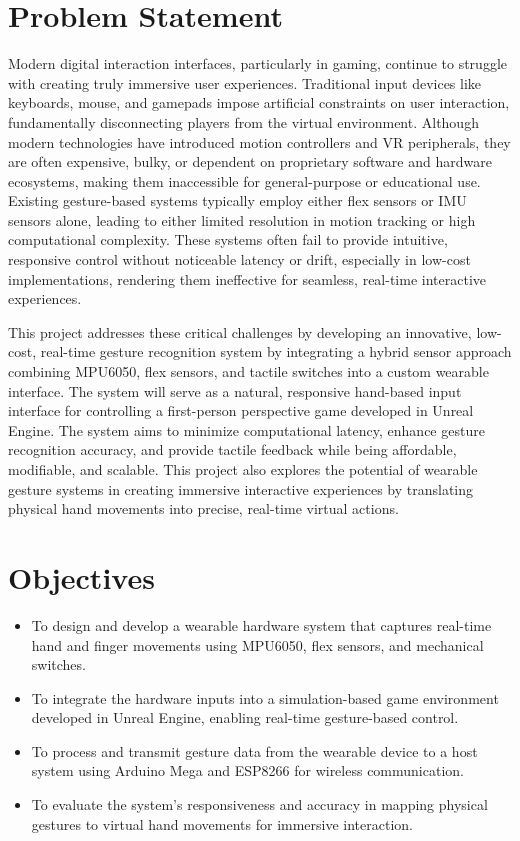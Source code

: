 \vspace{1.5\baselineskip} 

\section{Problem Statement}
Modern digital interaction interfaces, particularly in gaming, continue to struggle with creating truly immersive user experiences. Traditional input devices like keyboards, mouse, and gamepads impose artificial constraints on user interaction, fundamentally disconnecting players from the virtual environment. Although modern technologies have introduced motion controllers and VR peripherals, they are often expensive, bulky, or dependent on proprietary software and hardware ecosystems, making them inaccessible for general-purpose or educational use. Existing gesture-based systems typically employ either flex sensors or IMU sensors alone, leading to either limited resolution in motion tracking or high computational complexity. These systems often fail to provide intuitive, responsive control without noticeable latency or drift, especially in low-cost implementations, rendering them ineffective for seamless, real-time interactive experiences.  

This project addresses these critical challenges by developing an innovative, low-cost, real-time gesture recognition system by integrating a hybrid sensor approach combining MPU6050, flex sensors, and tactile switches into a custom wearable interface. The system will serve as a natural, responsive hand-based input interface for controlling a first-person perspective game developed in Unreal Engine. The system aims to minimize computational latency, enhance gesture recognition accuracy, and provide tactile feedback while being affordable, modifiable, and scalable. This project also explores the potential of wearable gesture systems in creating immersive interactive experiences by translating physical hand movements into precise, real-time virtual actions. 

\vspace{1.5\baselineskip} 

\section{Objectives}
\begin{itemize}
    \item To design and develop a wearable hardware system that captures real-time hand and finger movements using MPU6050, flex sensors, and mechanical switches.
    \item To integrate the hardware inputs into a simulation-based game environment developed in Unreal Engine, enabling real-time gesture-based control.
    \item To process and transmit gesture data from the wearable device to a host system using Arduino Mega and ESP8266 for wireless communication.
    \item To evaluate the system's responsiveness and accuracy in mapping physical gestures to virtual hand movements for immersive interaction.
\end{itemize}


